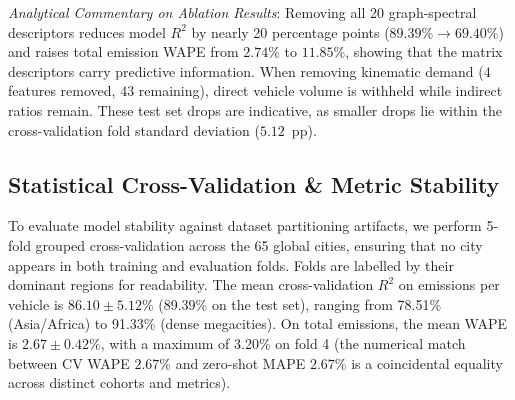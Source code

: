 \documentclass[journal]{IEEEtran}
\begin{document}
\textit{Analytical Commentary on Ablation Results}:
Removing all 20 graph-spectral descriptors reduces model $R^2$ by nearly 20 percentage points ($89.39\% \to 69.40\%$) and raises total emission WAPE from $2.74\%$ to $11.85\%$, showing that the matrix descriptors carry predictive information. When removing kinematic demand ($4$ features removed, $43$ remaining), direct vehicle volume is withheld while indirect ratios remain. These test set drops are indicative, as smaller drops lie within the cross-validation fold standard deviation ($5.12$~pp).

\subsection{Statistical Cross-Validation \& Metric Stability}
To evaluate model stability against dataset partitioning artifacts, we perform 5-fold grouped cross-validation across the 65 global cities, ensuring that no city appears in both training and evaluation folds. Folds are labelled by their dominant regions for readability. The mean cross-validation $R^2$ on emissions per vehicle is $86.10 \pm 5.12\%$ (89.39\% on the test set), ranging from 78.51\% (Asia/Africa) to 91.33\% (dense megacities). On total emissions, the mean WAPE is $2.67 \pm 0.42\%$, with a maximum of 3.20\% on fold 4 (the numerical match between CV WAPE $2.67\%$ and zero-shot MAPE $2.67\%$ is a coincidental equality across distinct cohorts and metrics).

\begin{table}[htbp]
\caption{5-Fold Cross-Validation Metrics Across Grouped Regional Metropolitan Splits}
\label{tab:cv_metrics}
\centering
{}
\end{table}
\end{document}
